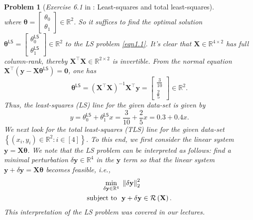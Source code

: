 \documentclass[11pt]{article}
\newtheorem{problem}{Problem}
\numberwithin{equation}{problem}
\begin{document}
\begin{problem} [\emph{Exercise 6.1} in \cite{calafiore2014optimization}: Least-squares and total least-squares]
{\begin{equation}
\end{equation}
where $\boldsymbol{\theta} = \begin{bmatrix} \theta_0 \\ \theta_1 \end{bmatrix} \in \mathbb{R}^2$. So it suffices to find the optimal solution $\boldsymbol{\theta}^{\textsf{LS}} = \begin{bmatrix} \theta_{0}^{\textsf{LS}} \\ \theta_{1}^{\textsf{LS}} \end{bmatrix} \in \mathbb{R}^2$ to the \textsf{LS} problem \eqref{eqn1.1}. It's clear that $\mathbf{X} \in \mathbb{R}^{4 \times 2}$ has full column-rank, thereby $\mathbf{X}^{\top} \mathbf{X} \in \mathbb{R}^{2 \times 2}$ is invertible. From the normal equation $\mathbf{X}^{\top} \left( \mathbf{y} - \mathbf{X} \boldsymbol{\theta}^{\textsf{LS}} \right) = \mathbf{0}$, one has
\begin{equation}
    \label{eqn1.2}
    \boldsymbol{\theta}^{\textsf{LS}} = \left( \mathbf{X}^{\top} \mathbf{X} \right)^{-1} \mathbf{X}^{\top} \mathbf{y} =
    \begin{bmatrix}
        \frac{3}{10} \\ \frac{2}{5}
    \end{bmatrix}
    \in \mathbb{R}^2.
\end{equation}
Thus, the least-squares (\textsf{LS}) line for the given data-set is given by
\begin{equation}
    \label{eqn1.3}
    y = \theta_{0}^{\textsf{LS}} + \theta_{1}^{\textsf{LS}} x = \frac{3}{10} + \frac{2}{5} x = 0.3 + 0.4 x.
\end{equation}
\medskip
\indent We next look for the total least-squares (\textsf{TLS}) line for the given data-set $\left\{ \left( x_i, y_i \right) \in \mathbb{R}^2 : i \in [4] \right\}$. To this end, we first consider the linear system $\mathbf{y} = \mathbf{X} \boldsymbol{\theta}$. We note that the \textsf{LS} problem can be interpreted as follows: find a \emph{minimal perturbation} $\delta \mathbf{y} \in \mathbb{R}^4$ in the $\mathbf{y}$ term so that the linear system $\mathbf{y} + \delta \mathbf{y} = \mathbf{X} \boldsymbol{\theta}$ becomes feasible, \emph{i.e.},
\begin{equation}
    \label{eqn1.4}
    \begin{split}
        \min_{\delta \mathbf{y} \in \mathbb{R}^4} \ &\left\| \delta \mathbf{y} \right\|_{2}^2 \\
        \textnormal{subject to }\ &\mathbf{y} + \delta \mathbf{y} \in \mathcal{R} \left( \mathbf{X} \right).
    \end{split}
\end{equation}
This interpretation of the \textsf{LS} problem was covered in our lectures.
\medskip

}
\end{problem}
\end{document}

